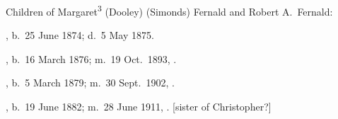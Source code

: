 \begin{KidsIntro}
	Children of Margaret\textsuperscript{3} (Dooley) (Simonds) Fernald and Robert A.\ Fernald:
\end{KidsIntro}	

\begin{Kids}
	
	, b.\ 25 June 1874;\cite{Anna4FernaldBirth} d.\ 5 May 1875.\cite{Anna4FernaldDeath}
	
	, b.\ 16 March 1876; m.\ 19 Oct.\ 1893, .
		
	, b.\ 5 March 1879; m.\ 30 Sept.\ 1902, .
	
	, b.\ 19 June 1882; m.\ 28 June 1911, . [sister of Christopher?]
	
\end{Kids}
	
	
